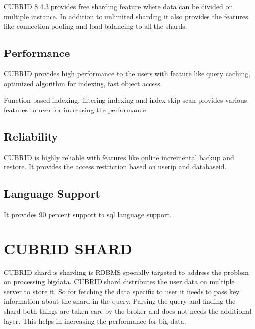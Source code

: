 \documentclass[9pt,twocolumn,twoside]{../../styles/osajnl}
\begin{document}
CUBRID 8.4.3 provides free sharding feature where data can be divided
on multiple instance.  In addition to unlimited sharding it also
provides the features like connection pooling and load balancing to
all the shards.

\subsection{Performance}

CUBRID provides high performance to the users with feature like query
caching, optimized algorithm for indexing, fast object access.

Function based indexing, filtering indexing and index skip scan
provides various features to user for increasing the performance

\subsection{Reliability}

CUBRID is highly reliable with features like online incremental backup
and restore.  It provides the access restriction based on userip and
databaseid.

\subsection{Language Support}
It provides 90 percent support to sql language support. 


\section{CUBRID SHARD}

CUBRID shard is sharding is RDBMS specially targeted to address the
problem on processing bigdata. CUBRID shard distributes the user data
on multiple server to store it. So for fetching the data specific to
user it needs to pass key information about the shard in the
query. Parsing the query and finding the shard both things are taken
care by the broker and does not needs the additional layer. This helps
in increasing the performance for big data. 

\newpage



 
\end{document}
